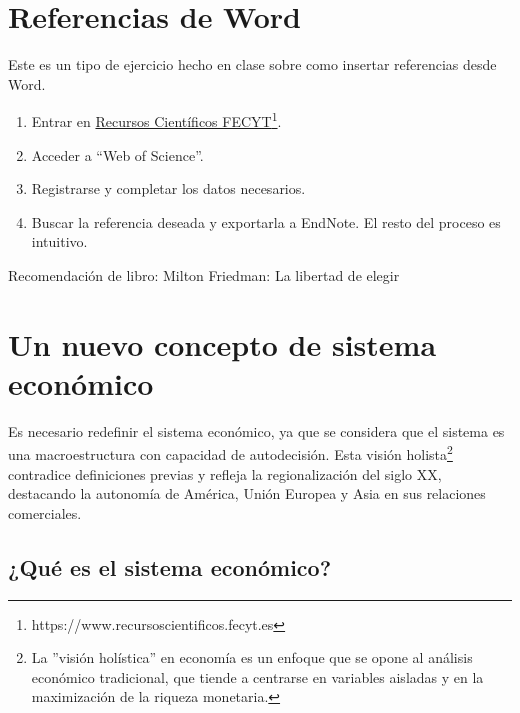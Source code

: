 \documentclass[12pt]{book} %
\begin{document}
\hypertarget{referencias-de-word}{%
\section{Referencias de Word}\label{referencias-de-word}}

\begin{ejercicio}

Este es un tipo de ejercicio hecho en clase sobre como insertar referencias desde Word.

\begin{enumerate}
   \item Entrar en \href{https://www.recursoscientificos.fecyt.es}{Recursos Científicos FECYT}\footnote{https://www.recursoscientificos.fecyt.es}.
   \item Acceder a “Web of Science”.
   \item Registrarse y completar los datos necesarios.
   \item Buscar la referencia deseada y exportarla a EndNote. El resto del proceso es intuitivo.
\end{enumerate}

Recomendación de libro: Milton Friedman: La libertad de elegir

\end{ejercicio}

\hypertarget{un-nuevo-concepto-de-sistema-econuxf3mico-tribuna-de-economuxeda}{%
\section{Un nuevo concepto de sistema económico }\label{un-nuevo-concepto-de-sistema-econuxf3mico-tribuna-de-economuxeda}}

Es necesario redefinir el sistema económico, ya que se considera que el
sistema es una macroestructura con capacidad de autodecisión. Esta
visión
holista\footnote{La ''visión holística'' en economía es un enfoque que se opone al análisis económico tradicional, que tiende a centrarse en variables aisladas y en la maximización de la riqueza monetaria.}
contradice definiciones previas y refleja la regionalización del siglo
XX, destacando la autonomía de América, Unión Europea y Asia en sus
relaciones comerciales.

\hypertarget{quuxe9-es-el-sistema-econuxf3mico}{%
\subsection{¿Qué es el sistema
económico?}\label{quuxe9-es-el-sistema-econuxf3mico}}
\end{document}
